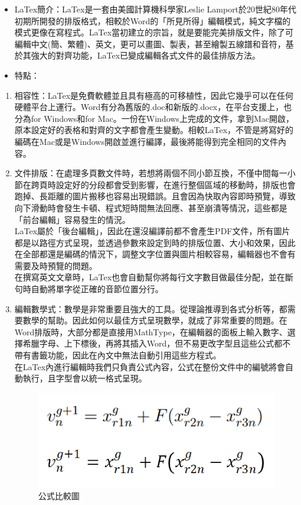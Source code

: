 \documentclass[14pt,a4paper]{report}  %
\begin{document}
{{{{{{	 \begin{itemize} 
        \item LaTex簡介：LaTex是一套由美國計算機科學家Leslie Lamport於20世紀80年代初期所開發的排版格式，相較於Word的「所見所得」編輯模式，純文字檔的模式更像在寫程式。LaTex當初建立的宗旨，就是要能完美排版文件，除了可編輯中文(簡、繁體)、英文，更可以畫圖、製表，甚至繪製五線譜和音符，基於其強大的對齊功能，LaTex已變成編輯各式文件的最佳排版方法。
		\item 特點：\\
		\end{itemize} 
		
		 \begin{enumerate}
		 \item 相容性：LaTex是免費軟體並且具有極高的可移植性，因此它幾乎可以在任何硬體平台上運行。Word有分為舊版的.doc和新版的.docx，在平台支援上，也分為for Windows和for Mac。一份在Windows上完成的文件，拿到Mac開啟，原本設定好的表格和對齊的文字都會產生變動。相較LaTex，不管是將寫好的編碼在Mac或是Windows開啟並進行編譯，最後將能得到完全相同的文件內容。
		 \item 文件排版：在處理多頁數文件時，若想將兩個不同小節互換，不僅中間每一小節在跨頁時設定好的分段都會受到影響，在進行整個區域的移動時，排版也會跑掉、長距離的圖片搬移也容易出現錯誤。且會因為快取內容即時預覽，導致向下滑動時會發生卡頓、程式短時間無法回應、甚至崩潰等情況，這些都是「前台編輯」容易發生的情況。\\
LaTex屬於「後台編輯」，因此在還沒編譯前都不會產生PDF文件，所有圖片都是以路徑方式呈現，並透過參數來設定到時的排版位置、大小和效果，因此在全部都還是編碼的情況下，調整文字位置與圖片相較容易，編輯器也不會有需要及時預覽的問題。\\
在撰寫英文文章時，LaTex也會自動幫你將每行文字數目做最佳分配，並在斷句時自動將單字從正確的音節位置分行。
		\item 編輯數學式：數學是非常重要且強大的工具。從理論推導到各式分析等，都需要數學的幫助。因此如何以最佳方式呈現數學，就成了非常重要的問題。在Word排版時，大部分都是直接用MathType，在編輯器的面板上輸入數字、選擇希臘字母、上下標後，再將其插入Word，但不易更改字型且這些公式都不帶有書籤功能，因此在內文中無法自動引用這些方程式。\\
在LaTex內進行編輯時我們只負責公式內容，公式在整份文件中的編號將會自動執行，且字型會以統一格式呈現。
	
		\begin{figure}[H]
        \centering
        \includegraphics[scale=0.8]{公式比較圖.png} 
        \caption{公式比較圖} 
		\label{fig_公式比較圖:scale}
    	\end{figure}
    	

\end{enumerate}}}}}}}
\end{document}
